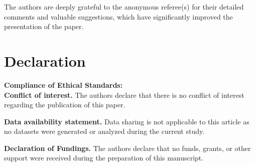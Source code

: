 \documentclass[a4paper,12pt]{amsart}
\theoremstyle{plain}
\theoremstyle{definition}
\begin{document}
 The authors are deeply grateful to the anonymous referee(s) for their detailed comments and valuable suggestions, which have significantly improved the presentation of the paper.

\section{\bf Declaration}
\noindent\textbf{Compliance of Ethical Standards:}\\

\noindent\textbf{Conflict of interest.} The authors declare that there is no conflict  of interest regarding the publication of this paper.\vspace{1.5mm}

\noindent\textbf{Data availability statement.}  Data sharing is not applicable to this article as no datasets were generated or analyzed during the current study.\vspace{1.5mm}

\noindent\textbf{Declaration of Fundings.} The authors declare that no funds, grants, or other support were received during the preparation of this manuscript.
\end{document}

